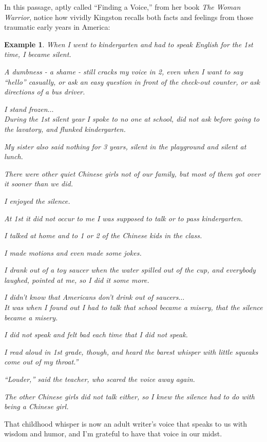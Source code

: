 \documentclass{book}
\numberwithin{equation}{section}
\newtheorem{example}{Example}[chapter]
\begin{document}
In this passage, aptly called ``Finding a Voice,'' from her book \textit{The Woman Warrior}, notice how vividly Kingston recalls both facts and feelings from those traumatic early years in America:
\begin{example}
    When I went to kindergarten and had to speak English for the 1st time, I became silent.
    
    A dumbness - a shame - still cracks my voice in 2, even when I want to say ``hello'' casually, or ask an easy question in front of the check-out counter, or ask directions of a bus driver.
    
    I stand frozen$\ldots$
    \\
    
    During the 1st silent year I spoke to no one at school, did not ask before going to the lavatory, and flunked kindergarten.
    
    My sister also said nothing for 3 years, silent in the playground and silent at lunch.
    
    There were other quiet Chinese girls not of our family, but most of them got over it sooner than we did.
    
    I enjoyed the silence.
    
    At 1st it did not occur to me I was supposed to talk or to pass kindergarten.
    
    I talked at home and to 1 or 2 of the Chinese kids in the class.
    
    I made motions and even made some jokes.
    
    I drank out of a toy saucer when the water spilled out of the cup, and everybody laughed, pointed at me, so I did it some more.
    
    I didn't know that Americans don't drink out of saucers$\ldots$
    \\
    
    It was when I found out I had to talk that school became a misery, that the silence became a misery.
    
    I did not speak and felt bad each time that I did not speak.
    
    I read aloud in 1st grade, though, and heard the barest whisper with little squeaks come out of my throat.''
    
    ``Louder,'' said the teacher, who scared the voice away again.
    
    The other Chinese girls did not talk either, so I knew the silence had to do with being a Chinese girl.
\end{example}
That childhood whisper is now an adult writer's voice that speaks to us with wisdom and humor, and I'm grateful to have that voice in our midst.
\end{document}
